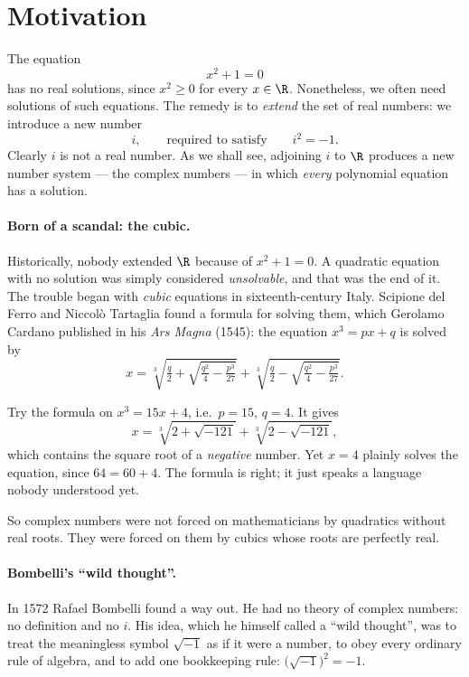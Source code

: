 \section{Motivation}

The equation
\[
x^2+1=0
\]
has no real solutions, since $x^2\geq 0$ for every $x\in\R$. Nonetheless, we often need solutions of such
equations. The remedy is to \emph{extend} the set of real numbers: we introduce a new number
\[
i, \qquad \text{required to satisfy} \qquad i^2 = -1.
\]
Clearly $i$ is not a real number. As we shall see, adjoining $i$ to $\R$ produces a new number system — the
complex numbers — in which \emph{every} polynomial equation has a solution.

\paragraph{Born of a scandal: the cubic.} Historically, nobody extended $\R$ because of $x^2+1=0$. A
quadratic equation with no solution was simply considered \emph{unsolvable}, and that was the end of it. The
trouble began with \emph{cubic} equations in sixteenth-century Italy. Scipione del Ferro and Niccolò
Tartaglia found a formula for solving them, which Gerolamo Cardano published in his \emph{Ars Magna} (1545):
the equation $x^3 = px+q$ is solved by
\[
x = \sqrt[3]{\tfrac{q}{2} + \sqrt{\tfrac{q^2}{4} - \tfrac{p^3}{27}}}
  + \sqrt[3]{\tfrac{q}{2} - \sqrt{\tfrac{q^2}{4} - \tfrac{p^3}{27}}}.
\]

\begin{warning}
Try the formula on $x^3 = 15x+4$, i.e.\ $p=15$, $q=4$. It gives
\[
x = \sqrt[3]{2+\sqrt{-121}} + \sqrt[3]{2-\sqrt{-121}},
\]
which contains the square root of a \emph{negative} number. Yet $x=4$ plainly solves the equation, since
$64 = 60+4$. The formula is right; it just speaks a language nobody understood yet.
\end{warning}

\noindent So complex numbers were not forced on mathematicians by quadratics without real roots. They were
forced on them by cubics whose roots are perfectly real.

\paragraph{Bombelli's ``wild thought''.} In 1572 Rafael Bombelli found a way out. He had no theory of
complex numbers: no definition and no $i$. His idea, which he himself called a ``wild thought'', was to
treat the meaningless symbol $\sqrt{-1}$ as if it were a number, to obey every ordinary rule of algebra,
and to add one bookkeeping rule: $\big(\sqrt{-1}\big)^2=-1$.

